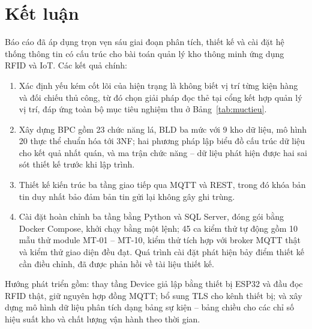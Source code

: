 \chapter{Kết luận}
\label{ch:ketluan}

Báo cáo đã áp dụng trọn vẹn sáu giai đoạn phân tích, thiết kế và cài đặt hệ thống thông tin có cấu trúc cho bài toán quản lý kho thông minh ứng dụng RFID và IoT. Các kết quả chính:
\begin{enumerate}
  \item Xác định yếu kém cốt lõi của hiện trạng là không biết vị trí từng kiện hàng và đối chiếu thủ công, từ đó chọn giải pháp đọc thẻ tại cổng kết hợp quản lý vị trí, đáp ứng toàn bộ mục tiêu nghiệm thu ở Bảng~\ref{tab:muctieu}.
  \item Xây dựng BPC gồm 23 chức năng lá, BLD ba mức với 9 kho dữ liệu, mô hình 20 thực thể chuẩn hóa tới 3NF; hai phương pháp lập biểu đồ cấu trúc dữ liệu cho kết quả nhất quán, và ma trận chức năng -- dữ liệu phát hiện được hai sai sót thiết kế trước khi lập trình.
  \item Thiết kế kiến trúc ba tầng giao tiếp qua MQTT và REST, trong đó khóa bản tin duy nhất bảo đảm bản tin gửi lại không gây ghi trùng.
  \item Cài đặt hoàn chỉnh ba tầng bằng Python và SQL Server, đóng gói bằng Docker Compose, khởi chạy bằng một lệnh; 45 ca kiểm thử tự động gồm 10 mẫu thử module MT-01 -- MT-10, kiểm thử tích hợp với broker MQTT thật và kiểm thử giao diện đều đạt. Quá trình cài đặt phát hiện bảy điểm thiết kế cần điều chỉnh, đã được phản hồi về tài liệu thiết kế.
\end{enumerate}

Hướng phát triển gồm: thay tầng Device giả lập bằng thiết bị ESP32 và đầu đọc RFID thật, giữ nguyên hợp đồng MQTT; bổ sung TLS cho kênh thiết bị; và xây dựng mô hình dữ liệu phân tích dạng bảng sự kiện -- bảng chiều cho các chỉ số hiệu suất kho và chất lượng vận hành theo thời gian.
